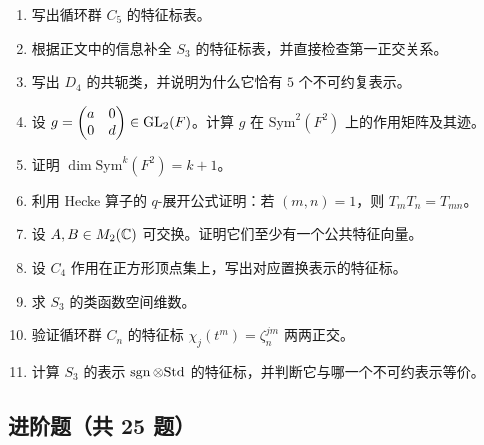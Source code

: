 \begin{enumerate}[label={\textbf{习题8.\arabic*.}}, wide=0pt, leftmargin=3.2em]
\item \basic 写出循环群 $C_5$ 的特征标表。

\item \basic 根据正文中的信息补全 $S_3$ 的特征标表，并直接检查第一正交关系。

\item \basic 写出 $D_4$ 的共轭类，并说明为什么它恰有 $5$ 个不可约复表示。

\item \basic 设 $g=\begin{pmatrix} a&0\\0&d \end{pmatrix}\in \mathrm{GL}_2(F)$。计算 $g$ 在 $\mathrm{Sym}^2(F^2)$ 上的作用矩阵及其迹。

\item \basic 证明 $\dim \mathrm{Sym}^k(F^2)=k+1$。

\item \basic 利用 Hecke 算子的 $q$-展开公式证明：若 $(m,n)=1$，则 $T_mT_n=T_{mn}$。

\item \basic 设 $A,B\in M_2(\mathbb{C})$ 可交换。证明它们至少有一个公共特征向量。

\item \basic 设 $C_4$ 作用在正方形顶点集上，写出对应置换表示的特征标。

\item \basic 求 $S_3$ 的类函数空间维数。

\item \basic 验证循环群 $C_n$ 的特征标 $\chi_j(t^m)=\zeta_n^{jm}$ 两两正交。

\item \basic 计算 $S_3$ 的表示 $\operatorname{sgn}\otimes \mathrm{Std}$ 的特征标，并判断它与哪一个不可约表示等价。
\end{enumerate}

\subsection*{进阶题（共 25 题）}

